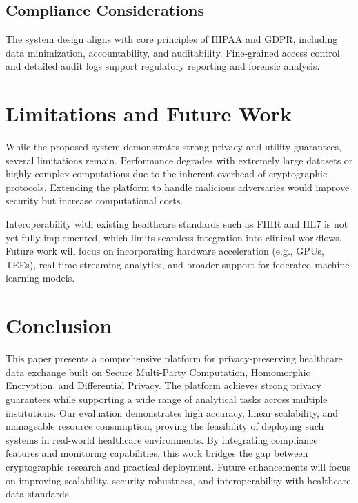 \documentclass[conference]{IEEEtran}
\begin{document}
\subsection{Compliance Considerations}
The system design aligns with core principles of HIPAA and GDPR, including data minimization, accountability, and auditability. Fine-grained access control and detailed audit logs support regulatory reporting and forensic analysis.

\section{Limitations and Future Work}
While the proposed system demonstrates strong privacy and utility guarantees, several limitations remain. Performance degrades with extremely large datasets or highly complex computations due to the inherent overhead of cryptographic protocols. Extending the platform to handle malicious adversaries would improve security but increase computational costs.

Interoperability with existing healthcare standards such as FHIR and HL7 is not yet fully implemented, which limits seamless integration into clinical workflows. Future work will focus on incorporating hardware acceleration (e.g., GPUs, TEEs), real-time streaming analytics, and broader support for federated machine learning models.

\section{Conclusion}
This paper presents a comprehensive platform for privacy-preserving healthcare data exchange built on Secure Multi-Party Computation, Homomorphic Encryption, and Differential Privacy. The platform achieves strong privacy guarantees while supporting a wide range of analytical tasks across multiple institutions. Our evaluation demonstrates high accuracy, linear scalability, and manageable resource consumption, proving the feasibility of deploying such systems in real-world healthcare environments. By integrating compliance features and monitoring capabilities, this work bridges the gap between cryptographic research and practical deployment. Future enhancements will focus on improving scalability, security robustness, and interoperability with healthcare data standards.



\end{document}
